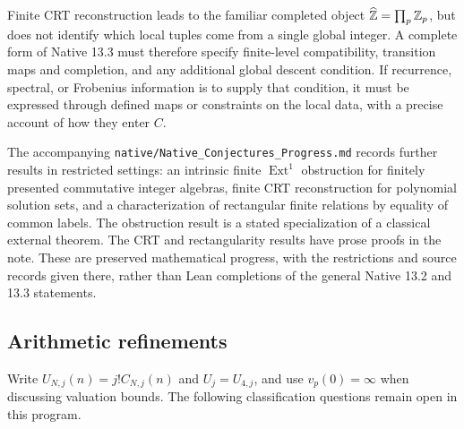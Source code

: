 Finite CRT reconstruction leads to the familiar completed object
$\widehat{\mathbb Z}=\prod_p\mathbb Z_p$, but does not identify which local tuples come from a
single global integer. A complete form of Native 13.3 must therefore specify
finite-level compatibility, transition maps and completion, and any additional
global descent condition. If recurrence, spectral, or Frobenius information
is to supply that condition, it must be expressed through defined maps or
constraints on the local data, with a precise account of how they enter $C$.

The accompanying \nolinkurl{native/Native_Conjectures_Progress.md} records
further results in restricted settings: an intrinsic finite
$\operatorname{Ext}^1$ obstruction for finitely presented commutative integer
algebras, finite CRT reconstruction for polynomial solution sets, and a
characterization of rectangular finite relations by equality of common
labels. The obstruction result is a stated specialization of a classical
external theorem. The CRT and rectangularity results have prose proofs in
the note. These are preserved mathematical progress, with the restrictions
and source records given there, rather than Lean completions of the general
Native 13.2 and 13.3 statements.

\subsection{Arithmetic refinements}
\label{subsec:arithmetic-open}

Write $U_{N,j}(n)=j!C_{N,j}(n)$ and $U_j=U_{4,j}$, and use
$v_p(0)=\infty$ when discussing valuation bounds. The following classification
questions remain open in this program.


